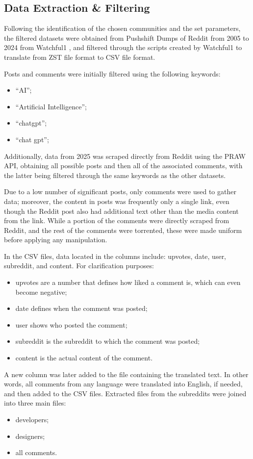\documentclass[conference]{IEEEtran}
\begin{document}
\subsection{Data Extraction \& Filtering}
Following the identification of the chosen communities and the set parameters, the filtered datasets were obtained from Pushshift Dumps of Reddit from 2005 to 2024 from Watchful1 \cite{b13}, and filtered through the scripts created by Watchful1 \cite{b14} to translate from ZST file format to CSV file format.

Posts and comments were initially filtered using the following keywords:
\begin{itemize}
    \item “AI”;
    \item “Artificial Intelligence”;
    \item “chatgpt”;
    \item “chat gpt”;
\end{itemize}

Additionally, data from 2025 was scraped directly from Reddit using the PRAW API, obtaining all possible posts and then all of the associated comments, with the latter being filtered through the same keywords as the other datasets.

Due to a low number of significant posts, only comments were used to gather data; moreover, the content in posts was frequently only a single link, even though the Reddit post also had additional text other than the media content from the link. While a portion of the comments were directly scraped from Reddit, and the rest of the comments were torrented, these were made uniform before applying any manipulation.

In the CSV files, data located in the columns include: upvotes, date, user, subreddit, and content. For clarification purposes:
\begin{itemize}
    \item upvotes are a number that defines how liked a comment is, which can even become negative;
    \item date defines when the comment was posted;
    \item user shows who posted the comment;
    \item subreddit is the subreddit to which the comment was posted;
    \item content is the actual content of the comment.
\end{itemize}

A new column was later added to the file containing the translated text. In other words, all comments from any language were translated into English, if needed, and then added to the CSV files. Extracted files from the subreddits were joined into three main files:
\begin{itemize}
    \item developers;
    \item designers;
    \item all comments.
\end{itemize}
\end{document}
